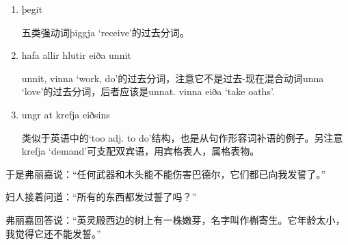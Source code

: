 \begin{grammar*}{}
  \begin{enumerate}[leftmargin=*]
    \item þegit

          五类强动词þiggja `receive'的过去分词。
    \item hafa allir hlutir eiða unnit

          unnit, vinna `work, do'的过去分词，注意它不是过去-现在混合动词unna `love'的过去分词，后者应该是unnat. vinna eiða `take oaths'.
    \item ungr at krefja eiðsins

          类似于英语中的`too adj. to do'结构，也是从句作形容词补语的例子。另注意krefja `demand'可支配双宾语，用宾格表人，属格表物。
  \end{enumerate}
\end{grammar*}
\begin{translation*}{}
  于是弗丽嘉说：“任何武器和木头能不能伤害巴德尔，它们都已向我发誓了。”

  妇人接着问道：“所有的东西都发过誓了吗？”

  弗丽嘉回答说：“英灵殿西边的树上有一株嫩芽，名字叫作槲寄生。它年龄太小，我觉得它还不能发誓。”
\end{translation*}


